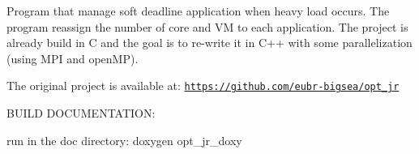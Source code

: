Program that manage soft deadline application when heavy load occurs. The program reassign the number of core and V\-M to each application. The project is already build in C and the goal is to re-\/write it in C++ with some parallelization (using M\-P\-I and open\-M\-P).

The original project is available at\-: \href{https://github.com/eubr-bigsea/opt_jr}{\tt https\-://github.\-com/eubr-\/bigsea/opt\-\_\-jr}

B\-U\-I\-L\-D D\-O\-C\-U\-M\-E\-N\-T\-A\-T\-I\-O\-N\-:

run in the doc directory\-: doxygen opt\-\_\-jr\-\_\-doxy 